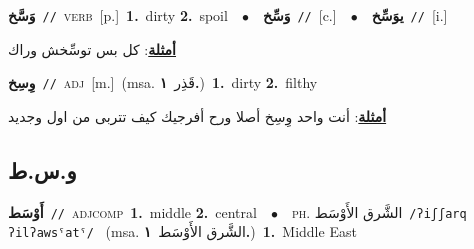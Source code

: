 \documentclass[10pt,a4paper,twoside]{article} %
\begin{document}
\begin{multicols}{2}
{\setlength\topsep{0pt}\textbf{\foreignlanguage{arabic}{وَسَّخ}}\ {\color{gray}\texttt{//}\color{black}}\ \textsc{verb}\ [p.]\ \textbf{1.}~dirty  \textbf{2.}~spoil\ \ $\bullet$\ \ \setlength\topsep{0pt}\textbf{\foreignlanguage{arabic}{وَسِّخ}}\ {\color{gray}\texttt{//}\color{black}}\ [c.]\ \ $\bullet$\ \ \setlength\topsep{0pt}\textbf{\foreignlanguage{arabic}{يوَسِّخ}}\ {\color{gray}\texttt{//}\color{black}}\ [i.]\  \begin{flushright}\color{gray}\foreignlanguage{arabic}{\textbf{\underline{\foreignlanguage{arabic}{أمثلة}}}: كل بس توسِّخش وراك}\end{flushright}\color{black}} \vspace{2mm}

{\setlength\topsep{0pt}\textbf{\foreignlanguage{arabic}{وِسِخ}}\ {\color{gray}\texttt{//}\color{black}}\ \textsc{adj}\ [m.]\ \color{gray}(msa. \foreignlanguage{arabic}{قَذِر}~\foreignlanguage{arabic}{\textbf{١.}})\color{black}\ \textbf{1.}~dirty  \textbf{2.}~filthy\  \begin{flushright}\color{gray}\foreignlanguage{arabic}{\textbf{\underline{\foreignlanguage{arabic}{أمثلة}}}: أنت واحد وِسِخ أصلا ورح أفرجيك كيف تتربى من اول وجديد}\end{flushright}\color{black}} \vspace{2mm}

\vspace{-3mm}
\subsection*{\color{blue}\foreignlanguage{arabic}{و.س.ط}\color{blue}{}} 

{\setlength\topsep{0pt}\textbf{\foreignlanguage{arabic}{أَوْسَط}}\ {\color{gray}\texttt{//}\color{black}}\ \textsc{adj\textunderscore comp}\ \textbf{1.}~middle  \textbf{2.}~central\ \ $\bullet$\ \ \textsc{ph.} \color{gray} \foreignlanguage{arabic}{الشَّرق الأَوْسَط}\color{black}\ {\color{gray}\texttt{/{\sffamily ʔiʃʃarq ʔilʔawsˤatˤ}/}\color{black}}\ \color{gray} (msa. \foreignlanguage{arabic}{الشَّرق الأَوْسَط}~\foreignlanguage{arabic}{\textbf{١.}})\color{black}\ \textbf{1.}~Middle East\ } \vspace{2mm}


\end{multicols}
\end{document}
